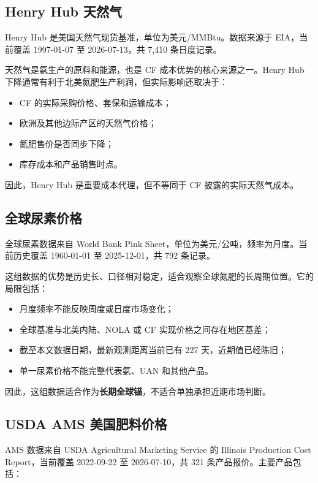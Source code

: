 \documentclass[11pt,a4paper]{ctexart}
\begin{document}
\subsection{Henry Hub 天然气}

Henry Hub 是美国天然气现货基准，单位为美元/MMBtu。数据来源于 EIA，当前覆盖 1997-01-07 至 2026-07-13，共 7,410 条日度记录。

天然气是氨生产的原料和能源，也是 CF 成本优势的核心来源之一。Henry Hub 下降通常有利于北美氮肥生产利润，但实际影响还取决于：

\begin{itemize}
  \item CF 的实际采购价格、套保和运输成本；
  \item 欧洲及其他边际产区的天然气价格；
  \item 氮肥售价是否同步下降；
  \item 库存成本和产品销售时点。
\end{itemize}

因此，Henry Hub 是重要成本代理，但不等同于 CF 披露的实际天然气成本。

\subsection{全球尿素价格}

全球尿素数据来自 World Bank Pink Sheet，单位为美元/公吨，频率为月度。当前历史覆盖 1960-01-01 至 2025-12-01，共 792 条记录。

这组数据的优势是历史长、口径相对稳定，适合观察全球氮肥的长周期位置。它的局限包括：

\begin{itemize}
  \item 月度频率不能反映周度或日度市场变化；
  \item 全球基准与北美内陆、NOLA 或 CF 实现价格之间存在地区基差；
  \item 截至本文数据日期，最新观测距离当前已有 227 天，近期值已经陈旧；
  \item 单一尿素价格不能完整代表氨、UAN 和其他产品。
\end{itemize}

因此，这组数据适合作为\textbf{长期全球锚}，不适合单独承担近期市场判断。

\subsection{USDA AMS 美国肥料价格}

AMS 数据来自 USDA Agricultural Marketing Service 的 Illinois Production Cost Report，当前覆盖 2022-09-22 至 2026-07-10，共 321 条产品报价。主要产品包括：
\end{document}
